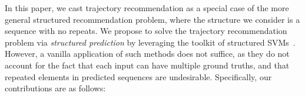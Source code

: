 In this paper, we cast trajectory recommendation as a special case of the more general
structured recommendation problem, where the structure we consider is a sequence with no repeats.
We propose to solve the trajectory recommendation problem
via \emph{structured prediction} by leveraging the toolkit of structured
SVMs~\citep{taskar2004max,tsochantaridis2004support}.
However, a vanilla application of such methods does not suffice,
as they do not account for the fact that each input can have multiple ground truths,
and that repeated elements in predicted sequences are undesirable.
Specifically, our contributions are as follows:

